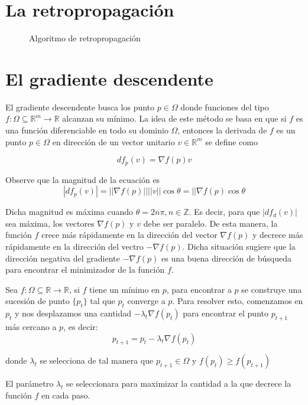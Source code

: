 \section{La retropropagación}
\begin{figure}[H]
	\centering
    \scalebox{0.8}{}
    \caption{Algoritmo de retropropagación}
\end{figure}

\section{El gradiente descendente}%
El gradiente descendente busca los punto $p \in \Omega$ donde funciones del tipo $f: \Omega\subseteq\mathbb{R}^m \rightarrow \mathbb{R}$ alcanzan su mínimo. La idea de este método se basa en que si $f$ es una función diferenciable en todo su dominio $\Omega$, entonces la derivada de $f$ es un punto $p \in \Omega$ en dirección de un vector unitario $v \in \mathbb{R}^m$ se define como

$$ df_{p}(v) = \nabla f(p)v $$

Observe que la magnitud de la ecuación es
$$ |d f_{p}(v)| = ||\nabla f(p)|| ||v||\cos\theta = ||\nabla f(p)\cos\theta$$

Dicha magnitud es máxima cuando $\theta = 2n\pi, n \in \mathbb{Z}$. Es decir, para que $|df_{d}(v)|$ sea máxima, los vectores $\nabla f(p)$ y $v$ debe ser paralelo. De esta manera, la función $f$ crece más rápidamente en la dirección del vector $\nabla f(p)$ y decrece más rápidamente en la dirección del vectro $-\nabla f(p)$. Dicha situación sugiere que la dirección negativa del gradiente $-\nabla f(p)$ es una buena dirección de búsqueda para encontrar el minimizador de la función $f$.

Sea $f: \Omega \subseteq \mathbb{R} \rightarrow \mathbb{R}$, si $f$ tiene un mínimo en $p$, para encontrar a $p$ se construye una sucesión de punto $\{p_{t}\}$ tal que $p_{t}$ converge a $p$. Para resolver esto, comenzamos en $p_{t}$ y nos desplazamos una cantidad $-\lambda_{t}\nabla f(p_{t})$ para encontrar el punto $p_{t + 1}$ más cercano a $p$, es decir:
$$ p_{t + 1} =p_{t} - \lambda _{t}\nabla f(p_{t}) $$

donde $\lambda_{t}$ se selecciona de tal manera que $p_{t + 1} \in \Omega$ y $f(p_{t}) \geq f(p_{t + 1})$

El parámetro $\lambda_{t}$ se seleccionara para maximizar la cantidad a la que decrece la función $f$ en cada paso.


